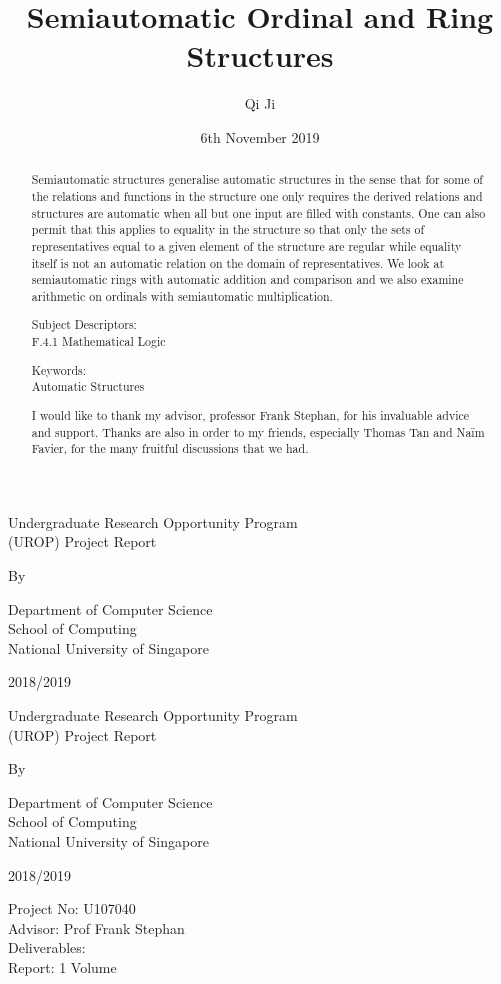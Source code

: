 \documentclass[british,a4paper,11pt,abstract=on]{scrreprt}
\title{Semiautomatic Ordinal and Ring Structures}
\author{Qi Ji}
\date{6th November 2019}
\makeatletter
\let\thetitle\@title
\let\theauthor\@author
\theoremstyle{definition}
\theoremstyle{remark}
\newcommand{\makecoverpage}{
    \begin{center}
        \singlespacing
        Undergraduate Research Opportunity Program \\
        (UROP) Project Report
        \vspace*{2cm}

        \doublespacing
        {\Large \textbf{\thetitle}}
        \vspace*{2cm}

        By \\
        \theauthor

        \vspace*{2cm}
        Department of Computer Science \\
        School of Computing \\
        National University of Singapore

        \vspace*{2cm}
        2018/2019
    \end{center}
}
\newenvironment{acknowledgements}{\renewcommand\abstractname{Acknowledgements}\begin{abstract}} {\end{abstract}}
\makeatother
\begin{document}
\let\setminus\smallsetminus
\let\epsilon\varepsilon
\begin{titlepage}
    \makecoverpage
\end{titlepage}
{}
\begin{titlepage}
    \makecoverpage
    \vspace*{3cm}

    \noindent
    Project No: U107040 \\
    Advisor: Prof Frank Stephan \\
    Deliverables: \\
    \hspace*{2em} Report: 1 Volume
\end{titlepage}

{}
\begin{abstract}
    Semiautomatic structures generalise automatic structures in the sense that for some of the relations and functions in the structure one only requires the derived relations and structures are automatic when all but one input are filled with constants.
    One can also permit that this applies to equality in the structure so that only the sets of representatives equal to a given element of the structure are regular while equality itself is not an automatic relation on the domain of representatives.
    We look at semiautomatic rings with automatic addition and comparison
    and we also examine arithmetic on ordinals with semiautomatic multiplication.

    \vspace*{1cm}
    \noindent
    Subject Descriptors: \\
    \hspace*{2em} F.4.1 Mathematical Logic

    \vspace*{1cm}
    \noindent
    Keywords: \\
    \hspace*{2em} Automatic Structures
\end{abstract}

{}
\begin{acknowledgements}
    I would like to thank my advisor, professor Frank Stephan, for his invaluable advice and support.
    Thanks are also in order to my friends, especially Thomas Tan and Na\"im Favier, for the many fruitful discussions that we had.
\end{acknowledgements}
\end{document}
